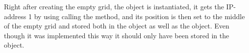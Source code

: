 \noindent Right after creating the empty grid, the  object is instantiated, it gets the IP-address 1 by using calling the  method, and its position is then set to the middle of the empty grid and stored both in the  object as well as the  object. Even though it was implemented this way it should only have been stored in the  object.






























